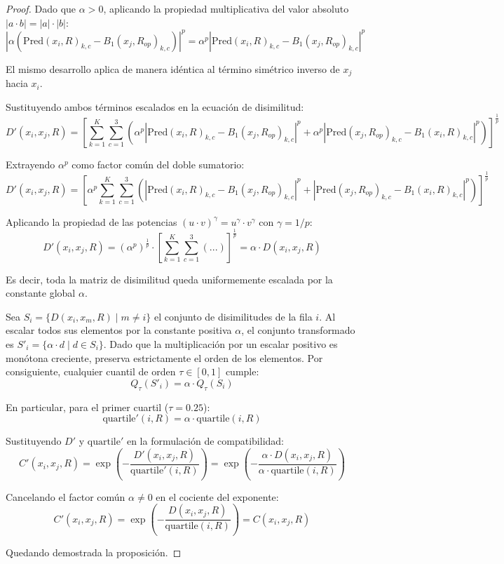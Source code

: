 \documentclass[a4paper]{article}
\theoremstyle{plain} %
\theoremstyle{plain} %
\begin{document}
\begin{proof}
Dado que $\alpha > 0$, aplicando la propiedad multiplicativa del valor absoluto $|a \cdot b| = |a| \cdot |b|$:
$$|\alpha (\text{Pred}(x_i, R)_{k,c} - B_1(x_j, R_{op})_{k,c})|^p = \alpha^p |\text{Pred}(x_i, R)_{k,c} - B_1(x_j, R_{op})_{k,c}|^p$$

El mismo desarrollo aplica de manera idéntica al término simétrico inverso de $x_j$ hacia $x_i$.


Sustituyendo ambos términos escalados en la ecuación de disimilitud:
$$D'(x_i, x_j, R) = \left[ \sum_{k=1}^{K} \sum_{c=1}^{3} \left( \alpha^p |\text{Pred}(x_i, R)_{k,c} - B_1(x_j, R_{op})_{k,c}|^p + \alpha^p |\text{Pred}(x_j, R_{op})_{k,c} - B_1(x_i, R)_{k,c}|^p \right) \right]^{\frac{1}{p}}$$

Extrayendo $\alpha^p$ como factor común del doble sumatorio:
$$D'(x_i, x_j, R) = \left[ \alpha^p \sum_{k=1}^{K} \sum_{c=1}^{3} \left( |\text{Pred}(x_i, R)_{k,c} - B_1(x_j, R_{op})_{k,c}|^p + |\text{Pred}(x_j, R_{op})_{k,c} - B_1(x_i, R)_{k,c}|^p \right) \right]^{\frac{1}{p}}$$

Aplicando la propiedad de las potencias $(u \cdot v)^\gamma = u^\gamma \cdot v^\gamma$ con $\gamma = 1/p$:
$$D'(x_i, x_j, R) = (\alpha^p)^{\frac{1}{p}} \cdot \left[ \sum_{k=1}^{K} \sum_{c=1}^{3} (...) \right]^{\frac{1}{p}} = \alpha \cdot D(x_i, x_j, R)$$

Es decir, toda la matriz de disimilitud queda uniformemente escalada por la constante global $\alpha$.


Sea $S_i = \{D(x_i, x_m, R) \mid m \neq i\}$ el conjunto de disimilitudes de la fila $i$. Al escalar todos sus elementos por la constante positiva $\alpha$, el conjunto transformado es $S'_i = \{\alpha \cdot d \mid d \in S_i\}$. Dado que la multiplicación por un escalar positivo es monótona creciente, preserva estrictamente el orden de los elementos. Por consiguiente, cualquier cuantil de orden $\tau \in [0, 1]$ cumple:
$$Q_\tau(S'_i) = \alpha \cdot Q_\tau(S_i)$$

En particular, para el primer cuartil ($\tau = 0.25$):
$$\text{quartile}'(i, R) = \alpha \cdot \text{quartile}(i, R)$$


Sustituyendo $D'$ y $\text{quartile}'$ en la formulación de compatibilidad:
$$C'(x_i, x_j, R) = \exp\left( -\frac{D'(x_i, x_j, R)}{\text{quartile}'(i, R)} \right) = \exp\left( -\frac{\alpha \cdot D(x_i, x_j, R)}{\alpha \cdot \text{quartile}(i, R)} \right)$$

Cancelando el factor común $\alpha \neq 0$ en el cociente del exponente:
$$C'(x_i, x_j, R) = \exp\left( -\frac{D(x_i, x_j, R)}{\text{quartile}(i, R)} \right) = C(x_i, x_j, R)$$

Quedando demostrada la proposición.     
\end{proof}
\end{document}
